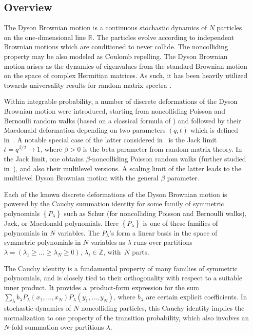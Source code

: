 \documentclass[pdftex]{sigma}
\numberwithin{equation}{section}
\begin{document}
\subsection{Overview}

The Dyson Brownian motion \cite{dyson1962brownian}
is a continuous stochastic dynamics of $N$
particles on the one-dimensional line $\mathbb{R}$.
The particles evolve according to independent
Brownian motions which are conditioned to never collide.
The noncolliding property may be also modeled as
Coulomb repelling.
The Dyson Brownian motion
arises
as the dynamics of eigenvalues from the standard Brownian motion
on the space of complex Hermitian matrices. As such,
it has been heavily utilized towards universality
results for random matrix spectra
\cite{AndersonGuionnetZeitouniBook,LY_RMT_Bull2011,Johansson2001Universality}.

Within integrable probability, a number of discrete deformations of the
Dyson Brownian motion were introduced, starting from
noncolliding Poisson and Bernoulli random walks
\cite{konig2002non}
(based on a classical formula of \cite{KMG59-Coincidence})
and
followed by
their Macdonald deformation depending on two parameters $(q,t)$ which is
defined in~\cite{BorodinCorwin2011Macdonald}.
A notable special case of the latter
considered in~\cite{GorinShkolnikov2014}
is the Jack limit $t=q^{\beta/2}\to 1$, where $\beta>0$ is the
beta parameter from random matrix theory. In the Jack limit,
one obtains $\beta$-noncolliding Poisson random walks
(further studied in~\cite{huang2021beta}),
and also their multilevel versions.
A scaling limit of the latter leads to the multilevel
Dyson Brownian motion with the general $\beta$ parameter.

Each of the known discrete deformations of the Dyson Brownian motion
is powered by the Cauchy summation
identity for some family of symmetric polynomials
$\left\{ P_\lambda \right\}$
such as
Schur (for noncolliding Poisson and Bernoulli walks),
Jack, or Macdonald polynomials.
Here $\left\{ P_\lambda \right\}$ is one of these families
of polynomials
in $N$ variables. The $P_\lambda$'s
form a linear basis in the space
of symmetric polynomials in $N$ variables as $\lambda$ runs
over
partitions $\lambda=(\lambda_1\ge \dots\ge \lambda_N\ge0 )$,
$\lambda_i\in \mathbb{Z}$, with~$N$ parts.

The Cauchy identity is a fundamental property of
many families of symmetric polynomials, and is
closely tied to their orthogonality with respect
to a suitable inner product.
It provides
a~product-form expression
for the sum $\sum_\lambda b_\lambda
P_\lambda(x_1,\dots,x_N )
P_\lambda(y_1,\dots,y_N )$,
where $b_\lambda$ are certain explicit coefficients.
In stochastic dynamics of $N$ noncolliding particles,
this Cauchy identity implies the normalization to one
property of the transition probability, which also involves an
$N$-fold summation over partitions $\lambda$.
\end{document}
